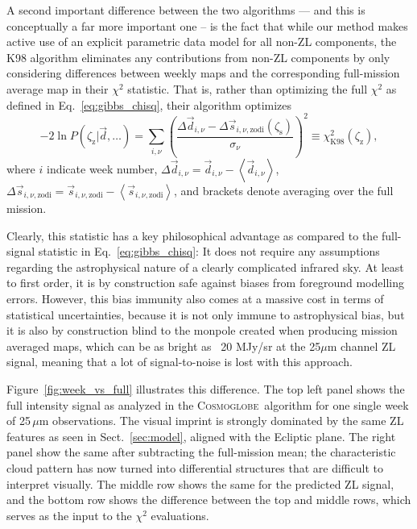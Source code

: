 \documentclass[twocolumn]{aa}
\newcommand{\dv}[0]{\vec{d}}
\newcommand{\s}[0]{\vec{s}}
\newcommand{\cosmoglobe}{\textsc{Cosmoglobe}}
\begin{document}
A second important difference between the two algorithms --- and this
is conceptually a far more important one -- is the fact that while our
method makes active use of an explicit parametric data model for all
non-ZL components, the K98 algorithm eliminates any contributions from
non-ZL components by only considering differences between weekly maps
and the corresponding full-mission average map in their $\chi^2$
statistic. That is, rather than optimizing the full $\chi^2$ as
defined in Eq.~\eqref{eq:gibbs_chisq}, their algorithm optimizes
\begin{equation}
  -2\ln P(\zeta_{\mathrm{z}}|\dv, \ldots) = \sum_{i,\nu}
  \left(\frac{\Delta\dv_{i,\nu} -
    \Delta\s_{i,\nu,\mathrm{zodi}}(\zeta_\mathrm{s})}{\sigma_{\nu}}\right)^2 \equiv
  \chi^2_{\mathrm{K98}} (\zeta_{\mathrm{z}}),
  \label{eq:k98_chisq}
\end{equation}
where $i$ indicate week number, $\Delta \dv_{i,\nu} = \dv_{i,\nu} -
\left<\dv_{i,\nu}\right>$, $\Delta \s_{i,\nu,\mathrm{zodi}} =
\s_{i,\nu,\mathrm{zodi}} - \left<\s_{i,\nu,\mathrm{zodi}}\right>$, and brackets
denote averaging over the full mission.

Clearly, this statistic has a key philosophical advantage as compared
to the full-signal statistic in Eq.~\eqref{eq:gibbs_chisq}: It does
not require any assumptions regarding the astrophysical nature of a
clearly complicated infrared sky. At least to first order, it is by
construction safe against biases from foreground modelling
errors. However, this bias immunity also comes at a massive cost in
terms of statistical uncertainties, because it is not only immune to
astrophysical bias, but it is also by construction blind to the monpole 
created when producing mission averaged maps, which can be as bright as 
~20 MJy/sr at the 25$\mu$m channel ZL signal, meaning that a lot of 
signal-to-noise is lost with this approach.

Figure~\ref{fig:week_vs_full} illustrates this difference. The top
left panel shows the full intensity signal as analyzed in the
\cosmoglobe\ algorithm for one single week of 25\,$\mu$m
observations. The visual imprint is strongly dominated by the same ZL
features as seen in Sect.~\ref{sec:model}, aligned with the Ecliptic
plane. The right panel show the same after subtracting the
full-mission mean; the characteristic cloud pattern has now turned
into differential structures that are difficult to interpret
visually. The middle row shows the same for the predicted ZL signal,
and the bottom row shows the difference between the top and middle
rows, which serves as the input to the $\chi^2$ evaluations.
\end{document}
